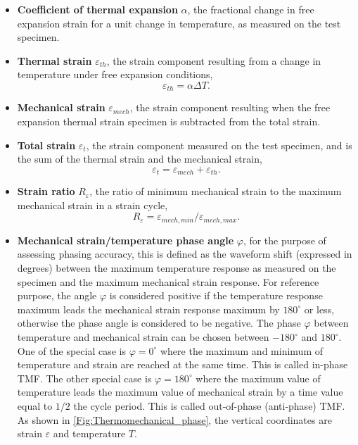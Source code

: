 \begin{itemize}
  \item \textbf{Coefficient of thermal expansion} $\alpha$, the fractional change in free expansion strain for a unit change in temperature, as measured on the test specimen.
  \item \textbf{Thermal strain} $\varepsilon_{th}$, the strain component resulting from a change in temperature under free expansion conditions,
  \begin{equation}
  \varepsilon_{th}=\alpha\Delta T.
  \label{Equ:thermal_strain}
  \end{equation}
  \item \textbf{Mechanical strain} $\varepsilon_{mech}$, the strain component resulting when the free expansion thermal strain specimen is subtracted from the total strain.
  \item \textbf{Total strain} $\varepsilon_t$, the strain component measured on the test specimen, and is the sum of the thermal strain and the mechanical strain,
  \begin{equation}
  \varepsilon_t=\varepsilon_{mech}+\varepsilon_{th}.
  \label{Equ:total_strain}
  \end{equation}
  \item \textbf{Strain ratio} $R_{\varepsilon}$, the ratio of minimum mechanical strain to the maximum mechanical strain in a strain cycle,
  \begin{equation}
  R_{\varepsilon}=\varepsilon_{mech,min}/\varepsilon_{mech,max}.
  \end{equation}
  \item \textbf{Mechanical strain/temperature phase angle} $\varphi$, for the purpose of assessing phasing accuracy, this is defined as the waveform shift (expressed in degrees) between the maximum temperature response as measured on the specimen and the maximum mechanical strain response. For reference purpose, the angle $\varphi$ is considered positive if the temperature response maximum leads the mechanical strain response maximum by $180^\circ$ or less, otherwise the phase angle is considered to be negative.
      The phase $\varphi$ between temperature and mechanical strain can be chosen between $-180^\circ$ and $180^\circ$.
      One of the special case is $\varphi=0^\circ$ where the maximum and minimum of temperature and strain are reached at the same time. This is called in-phase TMF.
      The other special case is $\varphi=180^\circ$ where the maximum value of temperature leads the maximum value of mechanical strain by a time value equal to $1/2$ the cycle period. This is called out-of-phase (anti-phase) TMF.
      As shown in \ref{Fig:Thermomechanical_phase}, the vertical coordinates are strain $\varepsilon$ and temperature $T$.
\end{itemize}


